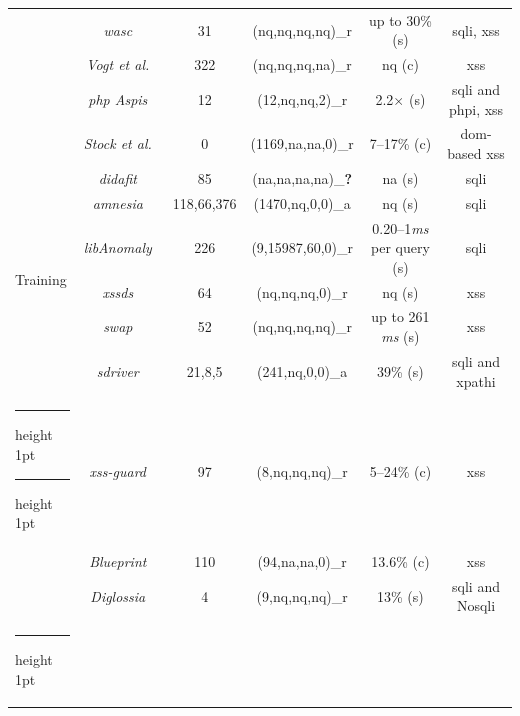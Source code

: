 \documentclass[conference]{IEEEtran}
\makeatletter
\newcommand{\xmark}{\ding{56}}
\newcommand{\thickhline}{%
    \noalign {\ifnum 0=`}\fi \hrule height 1pt
    \futurelet \reserved@a \@xhline
}
\makeatother
\begin{document}
\begin{table}
\begin{threeparttable}
\begin{small}
{\begin{tabular}{l|c|c|cc|c}
  &   {\it {\sc wasc}}~\cite{NLC07} & 31 & ({\sc nq},{\sc nq},{\sc nq},{\sc nq})\_r & up to 30\% ({\sc s}) & {\sc sql}i, {\sc xss} \\
  &   {\it Vogt et al.}~\cite{VFJKKV07} & 322 & ({\sc nq},{\sc nq},{\sc nq},{\sc na})\_r & {\sc nq} ({\sc c}) & {\sc xss} \\
  &   {\it {\sc php} Aspis}~\cite{PMP11} & 12 & (12,{\sc nq},{\sc nq},2)\_r & 2.2$\times$ ({\sc s}) & {\sc sql}i and {\sc php}i, {\sc xss} \\
  &   {\it Stock et al.}~\cite{SLMS14} & 0 & (1169,{\sc na},{\sc na},0)\_r & 7--17\% ({\sc c}) & {\sc dom}-based {\sc xss} \\
  \hline 
  \multirow{6}{*}{Training}
  &   {\it {\sc didafit}}~\cite{LLW02} & 85 & ({\sc na},{\sc na},{\sc na},{\sc na})\_{\bf ?} & {\sc na} ({\sc s}) & {\sc sql}i \\
  &   {\it {\sc amnesia}}~\cite{HO05,HO06,HO05b} & 118,66,376 & (1470,{\sc nq},0,0)\_a & {\sc nq} ({\sc s}) & {\sc sql}i \\ 
  &   {\it libAnomaly}~\cite{VMV05} & 226 & (9,15987,60,0)\_r & 0.20--1{\it ms} per query ({\sc s}) & {\sc sql}i \\
  &   {\it {\sc xssds}}~\cite{JEP08} & 64 & ({\sc nq},{\sc nq},{\sc nq},0)\_r & {\sc nq} ({\sc s}) & {\sc xss} \\
  &   {\it {\sc swap}}~\cite{WPLKK09} & 52 & ({\sc nq},{\sc nq},{\sc nq},{\sc nq})\_r & up to 261 {\it ms} ({\sc s}) & {\sc xss} \\ 
  &   {\it {\sc sd}river}~\cite{MS09,MKS09,MKLS11} & 21,8,5 & (241,{\sc nq},0,0)\_a & 39\% ({\sc s}) & {\sc sql}i and {\sc xp}athi \\
  \thickhline
  \thickhline
  \multirow{3}{*}{Hybrid}
  &   {\it {\sc xss-guard}}~\cite{BV08} & 97 & (8,{\sc nq},{\sc nq},{\sc nq})\_r & 5--24\% ({\sc c}) & {\sc xss} \\
  &   {\it Blueprint}~\cite{LV09} & 110 & (94,{\sc na},{\sc na},0)\_r & 13.6\% ({\sc c}) & {\sc xss} \\
  &   {\it Diglossia}~\cite{SMS13} & 4 & (9,{\sc nq},{\sc nq},{\sc nq})\_r & 13\% ({\sc s}) & {\sc sql}i and No{\sc sql}i \\
  \thickhline
    \end{tabular}}
    \begin{tablenotes}
  \begin{footnotesize}

\end{footnotesize}
\end{tablenotes}
\end{small}
\end{threeparttable}
\end{table}
\end{document}
